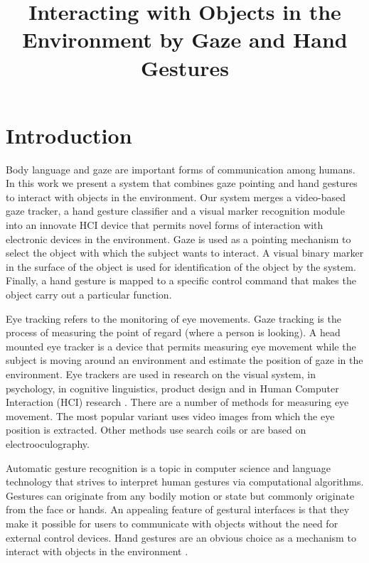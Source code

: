 \documentclass[jou,a4paper,notxfonts]{apa}
\title{Interacting with Objects in the Environment by Gaze and Hand Gestures}
\begin{document}
\maketitle

\thispagestyle{plain}

\section{Introduction} 
Body language and gaze are important forms of communication among humans. In this work we present a system that combines
gaze pointing and hand gestures to interact with objects in the environment. Our system merges a video-based gaze
tracker, a hand gesture classifier and a visual marker recognition module into an innovate HCI device that permits novel
forms of interaction with electronic devices in the environment. Gaze is used as a pointing mechanism to select the
object with which the subject wants to interact. A visual binary marker in the surface of the object is used for
identification of the object by the system. Finally, a hand gesture is mapped to a specific control command that makes the object carry out a particular function.

Eye tracking refers to the monitoring of eye movements. Gaze tracking is the process of measuring the point of regard (where a person is looking). A head mounted eye tracker is a device that permits measuring eye movement while the subject is moving around an environment and estimate the position of gaze in the environment. Eye trackers are used in research on the visual system, in psychology, in cognitive linguistics, product design and in Human Computer Interaction
(HCI) research \cite{myiwann2011}. There are a number of methods for measuring eye movement. The most popular variant uses video images from which the eye position is extracted. Other methods use search coils or are based on electrooculography.

Automatic gesture recognition is a topic in computer science and language technology that strives to interpret human
gestures via computational algorithms. Gestures can originate from any bodily motion or state but commonly originate
from the face or hands. An appealing feature of gestural interfaces is that they make it possible for users to
communicate with objects without the need for external control devices. Hand gestures are an obvious choice as a
mechanism to interact with objects in the environment \cite{Rozado2012b,myicann2010}.
\end{document}
